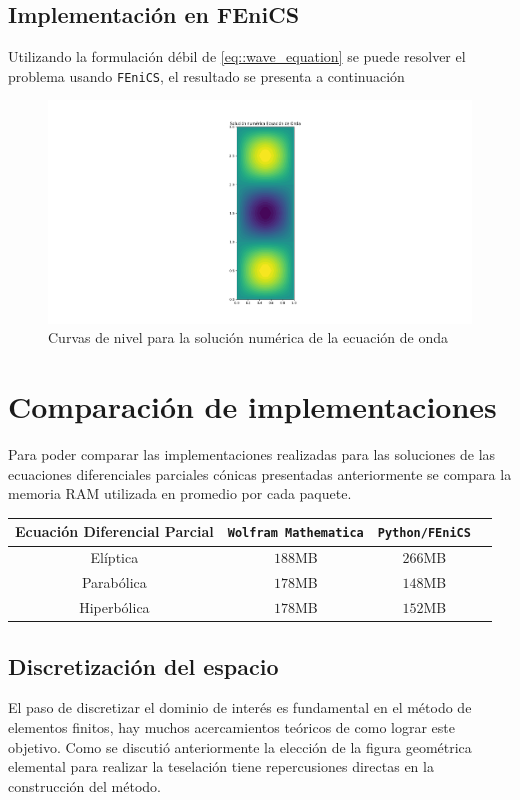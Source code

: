 \documentclass[a4paper]{article}
\begin{document}
\subsection{Implementación en FEniCS}
Utilizando la formulación débil de \ref{eq::wave_equation} se puede resolver el problema usando \texttt{FEniCS}, el resultado se presenta a continuación
\begin{figure}[H]
\begin{center}
\includegraphics[scale=0.32]{./wave_FEniCS.png} 
\end{center} 
\caption{Curvas de nivel para la solución numérica de la ecuación de onda}
\label{fig::fig8}
\end{figure}
\section{Comparación de implementaciones}
Para poder comparar las implementaciones realizadas para las soluciones de las ecuaciones diferenciales parciales cónicas presentadas anteriormente se compara la memoria RAM utilizada en promedio por cada paquete.\\
\begin{center}
\begin{tabular}{ |c|c|c|c| } 
\hline
Ecuación Diferencial Parcial & \texttt{Wolfram Mathematica}& \texttt{Python/FEniCS}\\
\hline
Elíptica& $188$MB & $266$MB \\ 
Parabólica& $178$MB& $148$MB\\ 
Hiperbólica& $178$MB & $152$MB\\ 
\hline
\end{tabular}
\end{center}
\subsection{Discretización del espacio}
El paso de discretizar el dominio de interés es fundamental en el método de elementos finitos, hay muchos acercamientos teóricos de como lograr este objetivo. Como se discutió anteriormente la elección de la figura geométrica elemental para realizar la teselación tiene repercusiones directas en la construcción del método.\\
\end{document}
